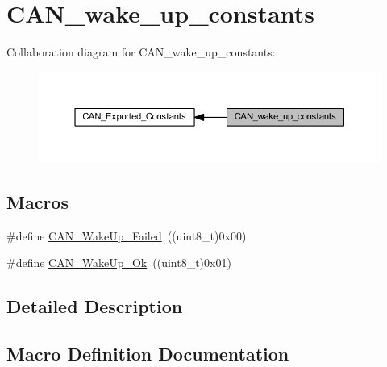 \hypertarget{group___c_a_n__wake__up__constants}{}\section{C\+A\+N\+\_\+wake\+\_\+up\+\_\+constants}
\label{group___c_a_n__wake__up__constants}
Collaboration diagram for C\+A\+N\+\_\+wake\+\_\+up\+\_\+constants\+:
\nopagebreak
\begin{figure}[H]
\begin{center}
\leavevmode
\includegraphics[width=350pt]{group___c_a_n__wake__up__constants}
\end{center}
\end{figure}
\subsection*{Macros}
\begin{DoxyCompactItemize}
\item 
\#define \hyperlink{group___c_a_n__wake__up__constants_ga837fd7ad47fee78e43a186544e2b390b}{C\+A\+N\+\_\+\+Wake\+Up\+\_\+\+Failed}~((uint8\+\_\+t)0x00)
\item 
\#define \hyperlink{group___c_a_n__wake__up__constants_ga152e4935cf85bdfb803eb36b656cd690}{C\+A\+N\+\_\+\+Wake\+Up\+\_\+\+Ok}~((uint8\+\_\+t)0x01)
\end{DoxyCompactItemize}


\subsection{Detailed Description}


\subsection{Macro Definition Documentation}
\mbox{\label{group___c_a_n__wake__up__constants_ga837fd7ad47fee78e43a186544e2b390b}} 
